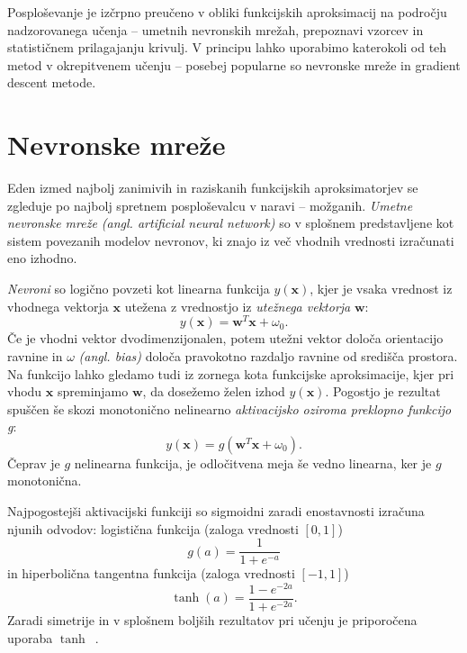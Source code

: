 \documentclass[a4paper, oneside, 12pt]{report}
\begin{document}
Posploševanje je izčrpno preučeno v obliki funkcijskih aproksimacij na področju nadzorovanega učenja -- umetnih nevronskih mrežah, prepoznavi vzorcev in statističnem prilagajanju krivulj. V principu lahko uporabimo katerokoli od teh metod v okrepitvenem učenju -- posebej popularne so nevronske mreže in gradient descent metode.

\section{Nevronske mreže}
Eden izmed najbolj zanimivih in raziskanih funkcijskih aproksimatorjev se zgleduje po najbolj spretnem posploševalcu v naravi -- možganih. {\em Umetne nevronske mreže (angl. artificial neural network)} so v splošnem predstavljene kot sistem povezanih modelov nevronov, ki znajo iz več vhodnih vrednosti izračunati eno izhodno.

{\em Nevroni} so logično povzeti kot linearna funkcija $y(\mathbf{x})$, kjer je vsaka vrednost iz vhodnega vektorja $\mathbf{x}$ utežena z vrednostjo iz {\em utežnega vektorja} $\mathbf{w}$:
\begin{equation}
y(\mathbf{x}) = \mathbf{w}^T \mathbf{x} + \omega_0.
\end{equation}
Če je vhodni vektor dvodimenzijonalen, potem utežni vektor določa orientacijo ravnine in $\omega$ {\em (angl. bias)} določa pravokotno razdaljo ravnine od središča prostora. Na funkcijo lahko gledamo tudi iz zornega kota funkcijske aproksimacije, kjer pri vhodu $\mathbf{x}$ spreminjamo $\mathbf{w}$, da dosežemo želen izhod $y(\mathbf{x})$. Pogostjo je rezultat spuščen še skozi monotonično nelinearno {\em aktivacijsko oziroma preklopno funkcijo g}:
\begin{equation}
y(\mathbf{x}) = g(\mathbf{w}^T \mathbf{x} + \omega_0).
\end{equation}
Čeprav je $g$ nelinearna funkcija, je odločitvena meja še vedno linearna, ker je $g$ monotonična.

Najpogostejši aktivacijski funkciji so sigmoidni zaradi enostavnosti izračuna njunih odvodov: logistična funkcija (zaloga vrednosti $[0, 1]$)
\begin{equation}
g(a) = \frac{1}{1 + e^{-a}}
\end{equation}
in hiperbolična tangentna funkcija (zaloga vrednosti $[-1, 1]$)
\begin{equation}
\tanh(a) = \frac{1 - e^{-2a}} {1 + e^{-2a}}.
\end{equation}
Zaradi simetrije in v splošnem boljših rezultatov pri učenju je priporočena uporaba $\tanh$~\cite{UnderstandingTheDifficultyOfTrainingDeepFeedforwardNeuralNetworks}.
\end{document}
